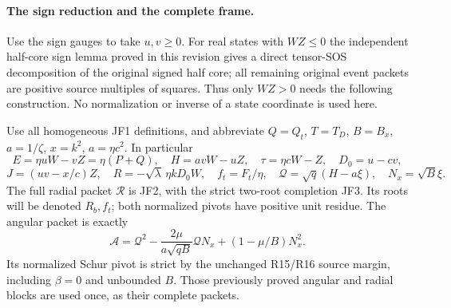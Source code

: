 \paragraph{The sign reduction and the complete frame.}
Use the sign gauges to take $u,v\ge0$. For real states with $WZ\le0$
the independent half-core sign lemma proved in this revision gives a
direct tensor-SOS decomposition of the original signed half core;
all remaining original event packets are positive source multiples
of squares. Thus only $WZ>0$ needs the following construction. No
normalization or inverse of a state coordinate is used here.

Use all homogeneous JF1 definitions, and abbreviate $Q=Q_t$,
$T=T_D$, $B=B_x$, $a=1/\zeta$, $x=k^2$, $a=\eta c^2$. In particular
\[
 E=\eta uW-vZ=\eta(P+Q),\quad H=avW-uZ,
 \quad \tau=\eta cW-Z,\quad D_0=u-cv,
\]
\[
 J=(uv-x/c)Z,\quad
 R=-\sqrt\lambda\,\eta kD_0W,\quad
 f_t=F_t/\eta,\quad \mathcal Q=\sqrt q(H-a\xi),
 \quad N_x=\sqrt B\xi.
\]
The full radial packet $\mathscr R$ is JF2, with the strict two-root
completion JF3. Its roots will be denoted $R_b,f_t$; both normalized
pivots have positive unit residue. The angular packet is exactly
\[
 \mathscr A=\mathcal Q^2
       -\frac{2\mu}{a\sqrt{qB}}\mathcal QN_x
       +(1-\mu/B)N_x^2.                              \tag{DG2}
\]
Its normalized Schur pivot is strict by the unchanged R15/R16 source
margin, including $\beta=0$ and unbounded $B$. Those previously
proved angular and radial blocks are used once, as their complete
packets.

